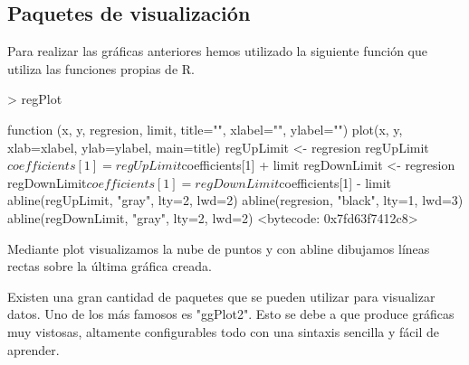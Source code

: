 \documentclass [a4paper] {article}
\begin{document}
\subsection{Paquetes de visualización}
Para realizar las gráficas anteriores hemos utilizado la siguiente función que utiliza las funciones propias de R.
\begin{Schunk}
\begin{Sinput}
> regPlot
\end{Sinput}
\begin{Soutput}
function (x, y, regresion, limit, title="", xlabel="", ylabel="") {
  plot(x, y, xlab=xlabel, ylab=ylabel, main=title)
  regUpLimit <- regresion
  regUpLimit$coefficients[1] = regUpLimit$coefficients[1] + limit
  regDownLimit <- regresion
  regDownLimit$coefficients[1] = regDownLimit$coefficients[1] - limit
  abline(regUpLimit, "gray", lty=2, lwd=2)
  abline(regresion, "black", lty=1, lwd=3)
  abline(regDownLimit, "gray", lty=2, lwd=2)
}
<bytecode: 0x7fd63f7412c8>
\end{Soutput}
\end{Schunk}
Mediante plot visualizamos la nube de puntos y con abline dibujamos líneas rectas sobre la última gráfica creada.

Existen una gran cantidad de paquetes que se pueden utilizar para visualizar datos.
Uno de los más famosos es "ggPlot2".
Esto se debe a que produce gráficas muy vistosas, altamente configurables todo con una sintaxis sencilla y fácil de aprender.
\end{document}
